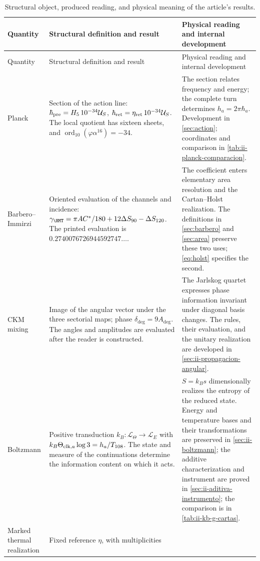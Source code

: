 \begingroup
\setlength{\LTpre}{0pt}
\setlength{\LTpost}{2pt}
\begin{longtable}{@{}p{.13\linewidth}p{.415\linewidth}p{.395\linewidth}@{}}
\caption{Structural object, produced reading, and physical meaning of
the article's results.}\label{tab:ii-conclusiones-estructura}\\
\toprule
Quantity & Structural definition and result & Physical reading and internal development\\
\midrule
\endfirsthead
\toprule
Quantity & Structural definition and result & Physical reading and internal development\\
\midrule
\endhead
\bottomrule
\endfoot
Planck & Section of the action line:
$\hbar_{\rm pre}=H_5\,10^{-34}\mathcal U_S$,
$\hbar_{\rm ret}=\eta_{\rm ret}\,10^{-34}\mathcal U_S$.
The local quotient has sixteen sheets, and
$\operatorname{ord}_{10}(\varphi\alpha^{16})=-34$.
& The section relates frequency and energy; the complete turn determines
$h_a=2\pi\hbar_a$. Development in \ref{sec:action}; coordinates and comparison
in \ref{tab:ii-planck-comparacion}.\\[5pt]
Barbero--Immirzi & Oriented evaluation of the channels and incidence:
$\gamma_{\HMT}=\pi AC^*/180+12\Delta S_{90}-\Delta S_{120}$.
The printed evaluation is $0.2740076726944592747\ldots$.
& The coefficient enters elementary area resolution and
the Cartan--Holst realization. The definitions in
\ref{sec:barbero} and \ref{sec:area} preserve these two uses;
\eqref{eq:holst} specifies the second.\\[5pt]
CKM mixing & Image of the angular vector under the three sectorial
maps; phase $\delta_{\deg}=9A_{\deg}$.
The angles and amplitudes are evaluated after the reader is constructed.
& The Jarlskog quartet expresses phase information invariant
under diagonal basis changes. The rules, their evaluation, and the
unitary realization are developed in
\ref{sec:ii-propagacion-angular}.\\[5pt]
Boltzmann & Positive transduction
$k_B:\mathcal L_\Theta\to\mathcal L_E$ with
$k_B\Theta_{{\rm clk},a}\log3=h_a/T_{108}$.
The state and measure of the continuations determine the information
content on which it acts.
& $S=k_Bs$ dimensionally realizes the entropy of the reduced state.
Energy and temperature bases and their transformations are preserved
in \ref{sec:ii-boltzmann}; the additive characterization and instrument
are proved in \ref{sec:ii-aditiva-instrumento}; the comparison is in
\ref{tab:ii-kb-g-cartas}.\\[5pt]
Marked thermal realization & Fixed reference $\eta$, with multiplicities

\end{longtable}
